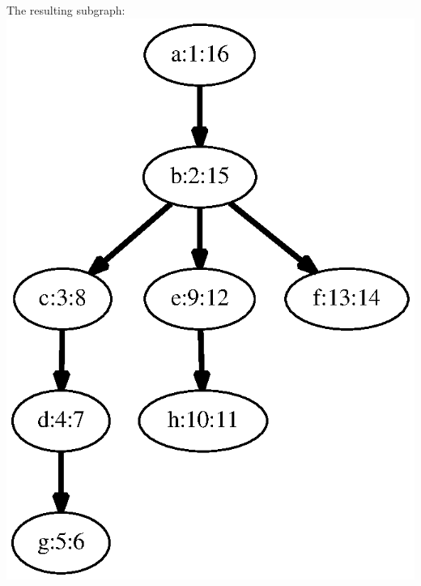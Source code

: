 \documentclass{article}
\begin{document}
\HR
\begin{minipage}[b][.25\textheight]{0.22727272727272727\linewidth}
The resulting subgraph: 
\includegraphics[height=.25\textheight]{dfs_directed_classroom_17.eps}
\end{minipage}
\end{document}
